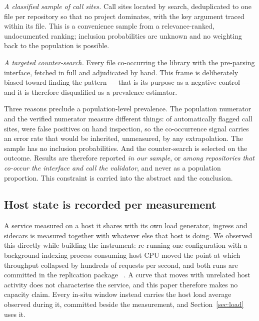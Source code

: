 \documentclass[pdflatex,sn-basic,twocolumn]{sn-jnl}%
\providecommand{\DIFaddbegin}{} %
\providecommand{\DIFaddend}{} %
\providecommand{\DIFdelbegin}{} %
\providecommand{\DIFdelend}{} %
\newcommand{\DIFscaledelfig}{0.5}
\newlength{\DIFdelgraphicswidth} %
\newlength{\DIFdelgraphicsheight} %
\newcommand{\DIFaddincludegraphics}[2][]{{\color{blue}\fbox{\DIFOincludegraphics[#1]{#2}}}} %
\newcommand{\DIFdelincludegraphics}[2][]{%
\sbox{\DIFdelgraphicsbox}{\DIFOincludegraphics[#1]{#2}}%
\settoboxwidth{\DIFdelgraphicswidth}{\DIFdelgraphicsbox} %
\settoboxtotalheight{\DIFdelgraphicsheight}{\DIFdelgraphicsbox} %
\scalebox{\DIFscaledelfig}{%
\parbox[b]{\DIFdelgraphicswidth}{\usebox{\DIFdelgraphicsbox}\\[-\baselineskip] \rule{\DIFdelgraphicswidth}{0em}}\llap{\resizebox{\DIFdelgraphicswidth}{\DIFdelgraphicsheight}{%
\setlength{\unitlength}{\DIFdelgraphicswidth}%
\begin{picture}(1,1)%
\thicklines\linethickness{2pt} %
{\color[rgb]{1,0,0}\put(0,0){\framebox(1,1){}}}%
{\color[rgb]{1,0,0}\put(0,0){\line( 1,1){1}}}%
{\color[rgb]{1,0,0}\put(0,1){\line(1,-1){1}}}%
\end{picture}%
}\hspace*{3pt}}} %
} %
\DeclareRobustCommand{\DIFaddbegin}{\DIFOaddbegin \let\includegraphics\DIFaddincludegraphics} %
\DeclareRobustCommand{\DIFaddend}{\DIFOaddend \let\includegraphics\DIFOincludegraphics} %
\DeclareRobustCommand{\DIFdelbegin}{\DIFOdelbegin \let\includegraphics\DIFdelincludegraphics} %
\DeclareRobustCommand{\DIFdelend}{\DIFOaddend \let\includegraphics\DIFOincludegraphics} %
\begin{document}
\emph{A classified sample of call sites.} Call sites located by search,
deduplicated to one file per repository so that no project dominates, with the
key argument traced within its file. This is a convenience sample from a
relevance-ranked, undocumented ranking; inclusion probabilities are unknown and
no weighting back to the population is possible.

\emph{A targeted counter-search.} Every file co-occurring the library with the
pre-parsing interface, fetched in full and adjudicated by hand. This frame is
deliberately biased toward finding the pattern --- that is its purpose as a
negative control --- and it is therefore disqualified as a prevalence estimator.

Three reasons preclude a population-level prevalence. The population numerator
and the verified numerator measure different things: of \AdjudicatedTotal{}
automatically flagged call sites, \AdjudicatedFalsePositive{} were false
positives on hand inspection, so the co-occurrence signal carries an error rate
that would be inherited, unmeasured, by any extrapolation. The sample has no
inclusion probabilities. And the counter-search is selected on the outcome.
Results are therefore reported \emph{in our sample}, or \emph{among repositories
that co-occur the interface and call the validator}, and never as a population
proportion. This constraint is carried into the abstract and the conclusion.

\subsection{Host state is recorded per measurement}\label{sec:hoststate}

A service measured on a host it shares with its own load generator, ingress and
sidecars is measured together with whatever else that host is doing. We observed
this directly while building the instrument: re-running one configuration with a
background indexing process consuming host CPU moved the point at which
throughput collapsed by hundreds of requests per second, and both runs are
committed in the replication package~\DIFdelbegin %
\DIFdelend \DIFaddbegin \citep{artifact2026}\DIFaddend . A curve that moves
with unrelated host activity does not characterise the service, and this paper
therefore makes no capacity claim. Every in-situ window instead carries the host
load average observed during it, committed beside the measurement, and
Section~\ref{sec:load} uses it.
\end{document}
